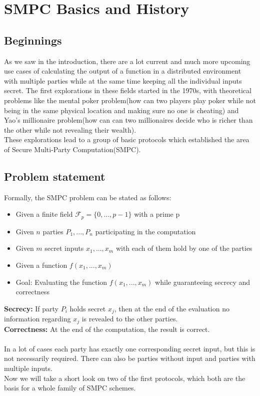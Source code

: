 \documentclass[english,runningheads,a4paper]{llncs}[2018/03/10]
\begin{document}
\section{SMPC Basics and History}\label{sec:smpc}

\subsection{Beginnings}
As we saw in the introduction, there are a lot current and much more upcoming use cases of calculating the output of a function in a distributed environment with multiple parties while at the same time keeping all the individual inputs secret. The first explorations in these fields started in the 1970s, with theoretical problems like the mental poker problem(how can two players play poker while not being in the same physical location and making sure no one is cheating) and Yao's millionaire problem(how can can two millionaires decide who is richer than the other while not revealing their wealth). \\
These explorations lead to a group of basic protocols which established the area of Secure Multi-Party Computation(SMPC).\\

\subsection{Problem statement}
Formally, the SMPC problem can be stated as follows:
\begin{itemize}
\item Given a finite field \( \mathcal{F}_p=\{0,...,p-1\}\) with a prime p
\item Given \(n\) parties \(P_1,...,P_n\) participating in the computation
\item Given \(m\) secret inputs \(x_1,...,x_m\) with each of them hold by one of the parties
\item Given a function \(f(x_1,...,x_m)\)
\item Goal: Evaluating the function \(f(x_1,...,x_m)\) while guaranteeing secrecy and correctness
\end{itemize}
\textbf{Secrecy:} If party \(P_i\) holds secret \(x_j\), then at the end of the evaluation no information regarding \(x_j\) is revealed to the other parties.\\
\textbf{Correctness:} At the end of the computation, the result is correct.\\\\
In a lot of cases each party has exactly one corresponding secret input, but this is not necessarily required. There can also be parties without input and parties with multiple inputs.\\
Now we will take a short look on two of the first protocols, which both are the basis for a whole family of SMPC schemes.
\end{document}
